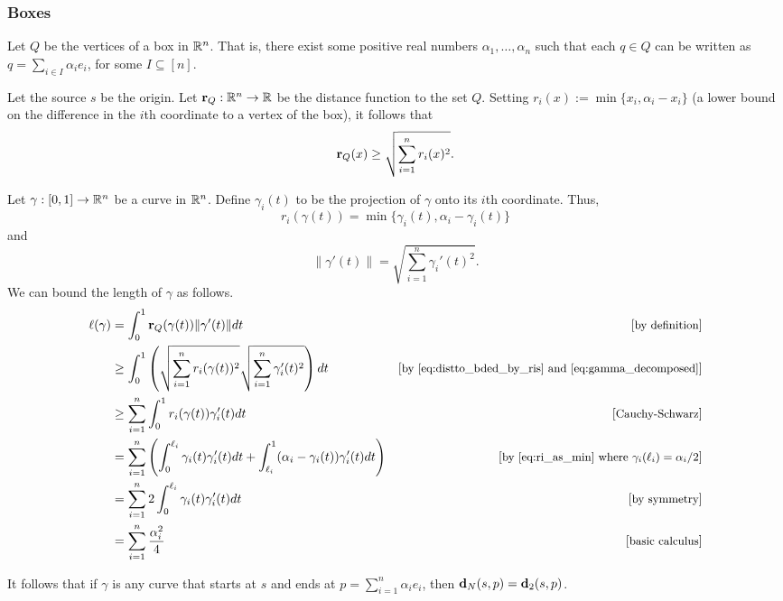 
\subsubsection{Boxes} %
\label{sec:boxes}

  Let $Q$ be the vertices of a box in $\mathbb{R}^n$.
  That is, there exist some positive real numbers $\alpha_1,\ldots , \alpha_n$ such that each $q\in Q$ can be written as $q = \sum_{i\in I} \alpha_i e_i$, for some $I\subseteq [n]$.

  Let the source $s$ be the origin.
  Let $\mathbf{r}_Q:\mathbb{R}^n\to \mathbb{R}$ be the distance function to the set $Q$.
  Setting $r_i(x) := \min\{x_i, \alpha_i - x_i\}$ (a lower bound on the difference in the $i$th coordinate to a vertex of the box), it follows that
  \begin{equation}
    \label{eq:distto_bded_by_ris}
    \mathbf{r}_Q(x) \ge \sqrt{\sum_{i= 1}^n r_i(x)^2}.
  \end{equation}

  Let $\gamma:[0,1]\to \mathbb{R}^n$ be a curve in $\mathbb{R}^n$.
  Define $\gamma_i(t)$ to be the projection of $\gamma$ onto its $i$th coordinate.
  Thus,
  \begin{equation}\label{eq:ri_as_min}
    r_i(\gamma(t)) = \min\{\gamma_i(t), \alpha_i - \gamma_i(t)\}
  \end{equation}
  and
  \begin{equation}\label{eq:gamma_decomposed}
    \|\gamma'(t)\| = \sqrt{\sum_{i = 1}^n \gamma_i'(t)^2}.
  \end{equation}
  We can bound the length of $\gamma$ as follows.
  \begin{align*}
    \ell(\gamma)
      &= \int_0^1 \mathbf{r}_Q(\gamma(t))\|\gamma'(t)\|dt &\left[\text{\small{by definition}}\right]\\
      &\ge \int_0^1 \left(\sqrt{\sum_{i= 1}^n r_i(\gamma(t))^2} \sqrt{\sum_{i = 1}^n \gamma_i'(t)^2}\right) dt &\left[\text{\small{by \eqref{eq:distto_bded_by_ris} and \eqref{eq:gamma_decomposed}}}\right]\\
      &\ge \sum_{i=1}^n \int_0^1 r_i(\gamma(t)) \gamma_i'(t) dt &\left[\text{\small{Cauchy-Schwarz}}\right]\\
      &= \sum_{i=1}^n \left(\int_0^{\ell_i} \gamma_i(t) \gamma_i'(t)dt + \int_{\ell_i}^1 (\alpha_i - \gamma_i(t)) \gamma_i'(t) dt\right) &\left[\text{\small{by \eqref{eq:ri_as_min} where $\gamma_i(\ell_i) = \alpha_i/2$}}\right]\\
      &= \sum_{i=1}^n 2\int_0^{\ell_i} \gamma_i(t) \gamma_i'(t) dt &\left[\text{\small{by symmetry}}\right]\\
      &= \sum_{i=1}^n \frac{\alpha_i^2}{4} &\left[\text{\small{basic calculus}}\right]
  \end{align*}

  It follows that if $\gamma$ is any curve that starts at $s$ and ends at $p = \sum_{i=1}^n \alpha_i e_i$, then $\mathbf{d}_N(s,p) = \mathbf{d}_2(s,p)$.

